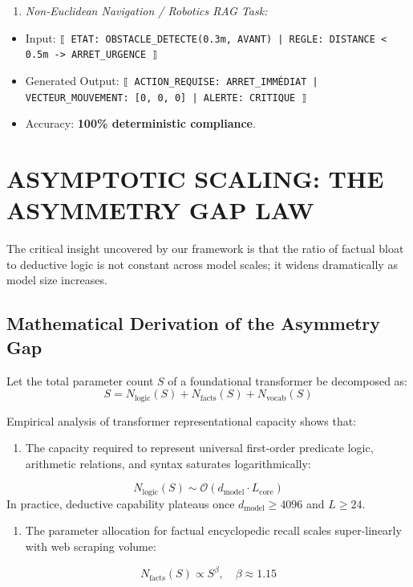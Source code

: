 \documentclass[10pt,twocolumn]{article}
\begin{document}
\begin{enumerate}
  \item \textit{Non-Euclidean Navigation / Robotics RAG Task:}
\end{enumerate}
\begin{itemize}
  \item Input: \texttt{⟦ ETAT: OBSTACLE_DETECTE(0.3m, AVANT) | REGLE: DISTANCE < 0.5m -> ARRET_URGENCE ⟧}
  \item Generated Output: \texttt{⟦ ACTION_REQUISE: ARRET_IMMÉDIAT | VECTEUR_MOUVEMENT: [0, 0, 0] | ALERTE: CRITIQUE ⟧}
  \item Accuracy: \textbf{100\% deterministic compliance}.
\end{itemize}



\section{ASYMPTOTIC SCALING: THE ASYMMETRY GAP LAW}

The critical insight uncovered by our framework is that the ratio of factual bloat to deductive logic is not constant across model scales; it widens dramatically as model size increases.


\subsection{Mathematical Derivation of the Asymmetry Gap}

Let the total parameter count $S$ of a foundational transformer be decomposed as:
\begin{equation}
  S = N_{\text{logic}}(S) + N_{\text{facts}}(S) + N_{\text{vocab}}(S)
\end{equation}

Empirical analysis of transformer representational capacity shows that:
\begin{enumerate}
  \item The capacity required to represent universal first-order predicate logic, arithmetic relations, and syntax saturates logarithmically:
\end{enumerate}
\begin{equation}
  N_{\text{logic}}(S) \sim \mathcal{O}(d_{\text{model}} \cdot L_{\text{core}})
\end{equation}
   In practice, deductive capability plateaus once $d_{\text{model}} \ge 4096$ and $L \ge 24$.
\begin{enumerate}
  \item The parameter allocation for factual encyclopedic recall scales super-linearly with web scraping volume:
\end{enumerate}
\begin{equation}
  N_{\text{facts}}(S) \propto S^\beta, \quad \beta \approx 1.15
\end{equation}
\end{document}
